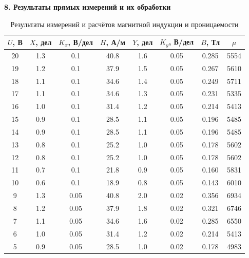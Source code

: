 \documentclass[12pt,fleqn]{article}
\begin{document}
\begin{flushleft}
    \textbf{8. Результаты прямых измерений и их обработки} \\

    \begin{table}[h!]
    \centering
    \caption{Результаты измерений и расчётов магнитной индукции и проницаемости}
    \begin{tabular}{|c|c|c|c|c|c|c|c|}
    \hline
    $U$, В & $X$, дел & $K_x$, В/дел & $H$, А/м & $Y$, дел & $K_y$, В/дел & $B$, Тл & $\mu$ \\ \hline
    20 & 1.3 & 0.1 & 40.8 & 1.6 & 0.05 & 0.285 & 5554 \\ \hline
    19 & 1.2 & 0.1 & 37.9 & 1.5 & 0.05 & 0.267 & 5610 \\ \hline
    18 & 1.1 & 0.1 & 34.6 & 1.4 & 0.05 & 0.249 & 5711 \\ \hline
    17 & 1.1 & 0.1 & 34.6 & 1.3 & 0.05 & 0.231 & 5335 \\ \hline
    16 & 1.0 & 0.1 & 31.4 & 1.2 & 0.05 & 0.214 & 5413 \\ \hline
    15 & 0.9 & 0.1 & 28.5 & 1.1 & 0.05 & 0.196 & 5485 \\ \hline
    14 & 0.9 & 0.1 & 28.5 & 1.1 & 0.05 & 0.196 & 5485 \\ \hline
    13 & 0.8 & 0.1 & 25.2 & 1.0 & 0.05 & 0.178 & 5602 \\ \hline
    12 & 0.8 & 0.1 & 25.2 & 1.0 & 0.05 & 0.178 & 5602 \\ \hline
    11 & 0.7 & 0.1 & 21.8 & 0.9 & 0.05 & 0.160 & 5831 \\ \hline
    10 & 0.6 & 0.1 & 18.9 & 0.8 & 0.05 & 0.143 & 6010 \\ \hline
    9  & 1.3 & 0.05 & 40.8 & 2.0 & 0.02 & 0.356 & 6934 \\ \hline
    8  & 1.2 & 0.05 & 37.9 & 1.8 & 0.02 & 0.321 & 6746 \\ \hline
    7  & 1.1 & 0.05 & 34.6 & 1.6 & 0.02 & 0.285 & 6550 \\ \hline
    6  & 1.0 & 0.05 & 31.4 & 1.2 & 0.02 & 0.214 & 5413 \\ \hline
    5  & 0.9 & 0.05 & 28.5 & 1.0 & 0.02 & 0.178 & 4983 \\ \hline
    \end{tabular}
    \end{table}


\end{flushleft}


\newpage
\end{document}
